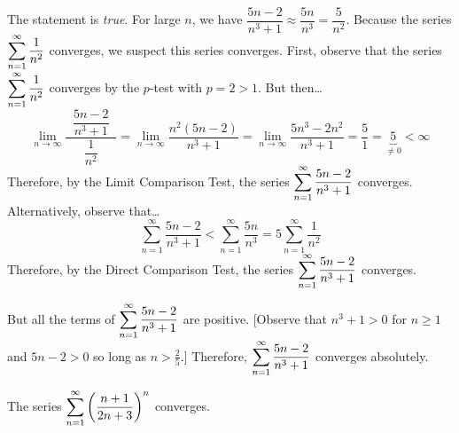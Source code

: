 \documentclass[11pt,letterpaper]{article}
\begin{document}
\sol The statement is \textit{true}. For large $n$, we have $\dfrac{5n - 2}{n^3 + 1} \approx \dfrac{5n}{n^3}= \dfrac{5}{n^2}$. Because the series $\displaystyle\sum_{n=1}^\infty \dfrac{1}{n^2}$ converges, we suspect this series converges. First, observe that the series $\displaystyle\sum_{n=1}^\infty \dfrac{1}{n^2}$ converges by the $p$-test with $p= 2 > 1$. But then\dots
	\[
	\lim_{n \to \infty} \dfrac{\;\;\dfrac{5n - 2}{n^3 + 1}\;\;}{\dfrac{1}{n^2}}= \lim_{n \to \infty} \dfrac{n^2(5n - 2)}{n^3 + 1}= \lim_{n \to \infty} \dfrac{5n^3 - 2n^2}{n^3 + 1}= \dfrac{5}{1}= \underbrace{5}_{\neq 0} < \infty
	\]
Therefore, by the Limit Comparison Test, the series $\displaystyle\sum_{n=1}^\infty \dfrac{5n - 2}{n^3 + 1}$ converges. Alternatively, observe that\dots
	\[
	\sum_{n=1}^\infty \dfrac{5n - 2}{n^3 + 1} < \sum_{n=1}^\infty \dfrac{5n}{n^3}= 5 \sum_{n=1}^\infty \dfrac{1}{n^2}
	\]
Therefore, by the Direct Comparison Test, the series $\displaystyle\sum_{n=1}^\infty \dfrac{5n - 2}{n^3 + 1}$ converges. \pspace

But all the terms of $\displaystyle\sum_{n=1}^\infty \dfrac{5n - 2}{n^3 + 1}$ are positive. [Observe that $n^3 + 1 > 0$ for $n \geq 1$ and $5n - 2 > 0$ so long as $n > \frac{2}{5}$.] Therefore, $\displaystyle\sum_{n=1}^\infty \dfrac{5n - 2}{n^3 + 1}$ converges absolutely. \pvspace{1.3cm}



 The series $\displaystyle\sum_{n=1}^\infty \left( \dfrac{n + 1}{2n + 3} \right)^n$ converges. \pspace
\end{document}

